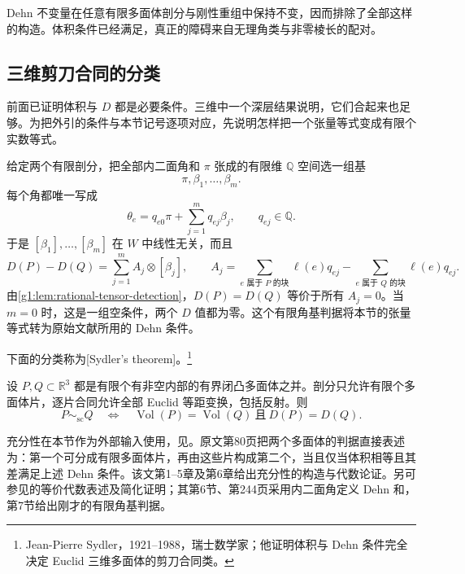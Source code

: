 Dehn 不变量在任意有限多面体剖分与刚性重组中保持不变，因而排除了全部这样的构造。体积条件已经满足，真正的障碍来自无理角类与非零棱长的配对。

\subsection{三维剪刀合同的分类}
\label{g1:subsec:E05:05}

前面已证明体积与 \(D\) 都是必要条件。三维中一个深层结果说明，它们合起来也足够。为把外引的条件与本节记号逐项对应，先说明怎样把一个张量等式变成有限个实数等式。

\ProseParagraphBreak

给定两个有限剖分，把全部内二面角和 \(\pi\) 张成的有限维 \(\mathbb Q\) 空间选一组基
\[
	\pi,\beta_1,\ldots,\beta_m.
\]
每个角都唯一写成
\[
	\theta_e=q_{e0}\pi+\sum_{j=1}^m q_{ej}\beta_j,
	\qquad q_{ej}\in\mathbb Q.
\]
于是 \([\beta_1],\ldots,[\beta_m]\) 在 \(W\) 中线性无关，而且
\[
	D(P)-D(Q)=\sum_{j=1}^m A_j\otimes[\beta_j],\qquad
	A_j=\sum_{e\text{ 属于 }P\text{ 的块}}\ell(e)q_{ej}
	-\sum_{e\text{ 属于 }Q\text{ 的块}}\ell(e)q_{ej}.
\]
由\cref{g1:lem:rational-tensor-detection}，\(D(P)=D(Q)\) 等价于所有 \(A_j=0\)。当 \(m=0\) 时，这是一组空条件，两个 \(D\) 值都为零。这个有限角基判据将本节的张量等式转为原始文献所用的 Dehn 条件。

\ProseParagraphBreak

下面的分类称为[Sydler's theorem]。\footnote{Jean-Pierre Sydler，1921--1988，瑞士数学家；他证明体积与 Dehn 条件完全决定 Euclid 三维多面体的剪刀合同类。}

\begin{theorem}
	\label{g1:thm:sydler-classification}
	设 \(P,Q\subset\mathbb R^3\) 都是有限个有非空内部的有界闭凸多面体之并。剖分只允许有限个多面体片，逐片合同允许全部 Euclid 等距变换，包括反射。则
	\[
		P\sim_{\mathrm{sc}}Q
		\quad\Longleftrightarrow\quad
		\operatorname{Vol}(P)=\operatorname{Vol}(Q)
		\ \text{且}\ D(P)=D(Q).
	\]
\end{theorem}

充分性在本节作为外部输入使用，见\cite[第0.1段，第43页；第6章末，第79--80页]{Sydler1965Polyhedres}。原文第80页把两个多面体的判据直接表述为：第一个可分成有限多面体片，再由这些片构成第二个，当且仅当体积相等且其差满足上述 Dehn 条件。该文第1--5章及第6章给出充分性的构造与代数论证。另可参见\cite[定理1，第243页；定理2及第7节，第245页]{Jessen1968DehnSydler}的等价代数表述及简化证明；其第6节、第244页采用内二面角定义 Dehn 和，第7节给出刚才的有限角基判据。

